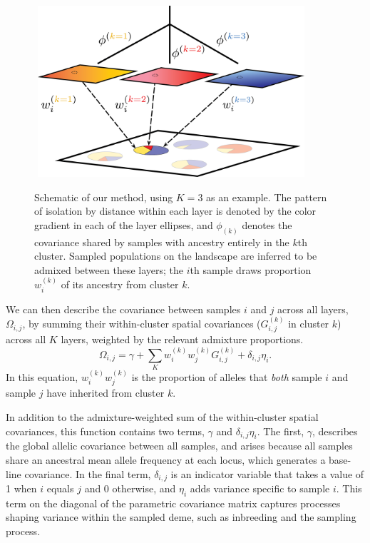 \documentclass[12pt]{article}
\begin{document}
\begin{figure}
	\centering
		{\includegraphics[width=4in,height=2.5in]{figs/schematic/method_schematic.png}}
		\caption{Schematic of our method, using $K=3$ as an example.
			     The pattern of isolation by distance within each layer is denoted by the color gradient in each of the layer ellipses, 
			     and $\phi_{(k)}$ denotes the covariance shared by samples with ancestry entirely in the $k$th cluster.
			     Sampled populations on the landscape are inferred to be admixed between these layers; 
			     the $i$th sample draws proportion $w^{(k)}_i$ of its ancestry from cluster $k$.
			    }\label{schematic}
\end{figure}

We can then describe the covariance between samples $i$ and $j$ across all layers, $\Omega_{i,j}$,
by summing their within-cluster spatial covariances ($G_{i,j}^{(k)}$ in cluster $k$) across all $K$ layers,
weighted by the relevant admixture proportions.
\begin{equation}
\Omega_{i,j} = \gamma + \sum\limits_K w^{(k)}_i w^{(k)}_j
G^{(k)}_{i,j} + \delta_{i,j}\eta_i .
\label{cross_cluster_covariance}
\end{equation}
In this equation, $w^{(k)}_i w^{(k)}_j$ is the proportion of alleles that \emph{both}
sample $i$ and sample $j$ have inherited from cluster $k$.

In addition to the admixture-weighted sum of the within-cluster spatial covariances,
this function contains two terms, $\gamma$ and $\delta_{i,j}\eta_i$.
The first, $\gamma$, describes the global allelic covariance between all samples, 
and arises because all samples share an ancestral mean allele frequency at each locus,
which generates a base-line covariance.
In the final term, $\delta_{i,j}$ is an indicator variable that takes a value of 1 when $i$ equals $j$ and 0 otherwise,
and $\eta_i$ adds variance specific to sample $i$.
This term on the diagonal of the parametric covariance matrix captures processes shaping variance within the sampled deme, 
such as inbreeding and the sampling process.
\end{document}
